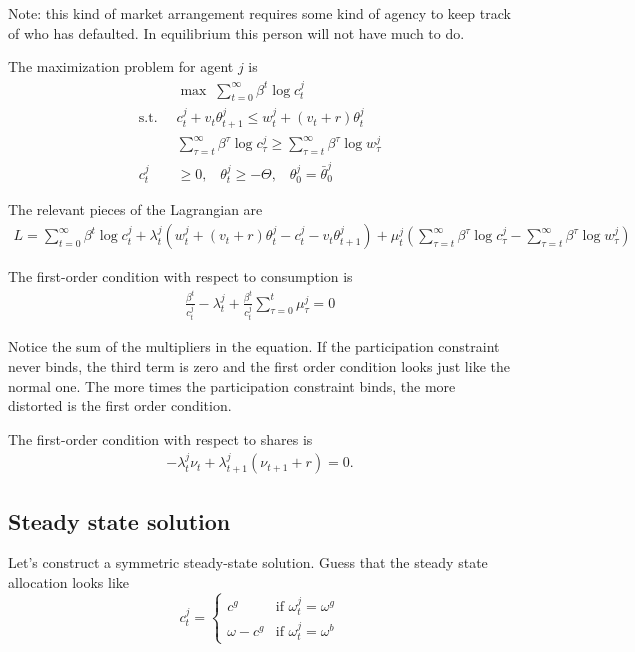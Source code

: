 \documentclass[11pt, pdftex]{article}
\begin{document}
Note: this kind of market arrangement requires some kind of agency to keep track of who has defaulted.  In equilibrium this person will not have much to do.

The maximization problem for agent $j$ is
\begin{align}\label{}
  &\max \;\sum_{t = 0}^\infty  {{\beta ^t}\log c_t^j}\\
  \mathrm{s.t.}\;\; &c_t^j + {v_t}\theta _{t + 1}^j \leq w_t^j + \left( {{v_t} + r} \right)\theta _t^j\\
 &  \sum_{\tau  = t}^\infty  {{\beta ^\tau }\log c_\tau ^j}  \geq \sum_{\tau  = t}^\infty  {{\beta ^\tau } \log w_\tau ^j}\\
 c_t^j & \geq 0, \;\;\; \theta _t^j \geq  - \Theta, \;\;\; \theta _0^j = \bar \theta _0^j
\end{align}

The relevant pieces of the Lagrangian are
\begin{align}\label{}
 L = \sum_{t = 0}^\infty  {{\beta ^t}\log c_t^j}  + \lambda _t^j\left( {w_t^j + \left( {{v_t} + r} \right)\theta _t^j - c_t^j - {v_t}\theta _{t + 1}^j} \right) + \mu _t^j\left( {\sum_{\tau  = t}^\infty  {{\beta ^\tau } \log c_\tau^j}  - \sum_{\tau  = t}^\infty  {{\beta ^\tau }\log w_\tau^j} } \right)
\end{align}

The first-order condition with respect to consumption is
\begin{align}\label{}
\frac{{{\beta ^t}}}{{c_t^j}} - \lambda _t^j + \frac{{{\beta ^t}}}{{c_t^j}}\sum_{\tau  = 0}^t {\mu _\tau^j = 0}
\end{align}


Notice the sum of the multipliers in the equation.  If the participation constraint never binds, the third term is zero and the first order condition looks just like the normal one.  The more times the participation constraint binds, the more distorted is the first order condition.

The first-order condition with respect to shares is
\begin{align}\label{}
 - \lambda _t^j{\nu _t} + \lambda _{t + 1}^j\left( {{\nu _{t + 1}} + r} \right) = 0.
\end{align}

\subsection*{Steady state solution}
Let's construct a symmetric steady-state solution. Guess that the steady state allocation looks like
\[c_t^j = \left\{ {\begin{array}{*{20}{l}}
  {{c^g}}&{{\text{if}}\,\,\omega _t^j = {\omega ^g}} \\
  {\omega  - {c^g}}&{{\text{if}}\,\,\omega _t^j = {\omega ^b}}
\end{array}} \right.\]
\end{document}
